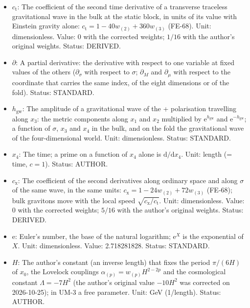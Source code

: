 \documentclass[
  10pt,
]{article}
\providecommand{\tightlist}{%
  \setlength{\itemsep}{0pt}\setlength{\parskip}{0pt}}
\begin{document}
\begin{itemize}
\tightlist
\item
  \(c_{\mathrm{t}}\): The coefficient of the second time derivative of a
  transverse traceless gravitational wave in the bulk at the static
  block, in units of its value with Einstein gravity alone:
  \(c_{\mathrm{t}} = 1 - 40w_{(2)} + 360w_{(3)}\) (FE-68). Unit:
  dimensionless. Value: 0 with the corrected weights; \(1/16\) with the
  author's original weights. Status: DERIVED.
\item
  \(\partial\): A partial derivative: the derivative with respect to one
  variable at fixed values of the others (\(\partial_\sigma\) with
  respect to \(\sigma\); \(\partial_M\) and \(\partial_\mu\) with
  respect to the coordinate that carries the same index, of the eight
  dimensions or of the fold). Status: STANDARD.
\item
  \(h_{\mathrm{gw}}\): The amplitude of a gravitational wave of the +
  polarisation travelling along \(x_3\): the metric components along
  \(x_1\) and \(x_2\) multiplied by \(\mathrm{e}^{h_{\mathrm{gw}}}\) and
  \(\mathrm{e}^{-h_{\mathrm{gw}}}\); a function of \(\sigma\), \(x_3\)
  and \(x_4\) in the bulk, and on the fold the gravitational wave of the
  four-dimensional world. Unit: dimensionless. Status: STANDARD.
\item
  \(x_4\): The time; a prime on a function of \(x_4\) alone is
  \(\mathrm{d}/\mathrm{d}x_4\). Unit: length (= time, \(c = 1\)).
  Status: AUTHOR.
\item
  \(c_{\mathrm{x}}\): The coefficient of the second derivatives along
  ordinary space and along \(\sigma\) of the same wave, in the same
  units: \(c_{\mathrm{x}} = 1 - 24w_{(2)} + 72w_{(3)}\) (FE-68); bulk
  gravitons move with the local speed
  \(\sqrt{c_{\mathrm{x}}/c_{\mathrm{t}}}\). Unit: dimensionless. Value:
  0 with the corrected weights; \(5/16\) with the author's original
  weights. Status: DERIVED.
\item
  \(\mathrm{e}\): Euler's number, the base of the natural logarithm;
  \(\mathrm{e}^{X}\) is the exponential of \(X\). Unit: dimensionless.
  Value: 2.718281828. Status: STANDARD.
\item
  \(H\): The author's constant (an inverse length) that fixes the period
  \(\pi/(6H)\) of \(x_0\), the Lovelock couplings
  \(\alpha_{(p)} = w_{(p)}H^{2-2p}\) and the cosmological constant
  \(\Lambda = -7H^2\) (the author's original value \(-10H^2\) was
  corrected on 2026-10-25); in UM-3 a free parameter. Unit: GeV
  (1/length). Status: AUTHOR.

\end{itemize}
\end{document}
